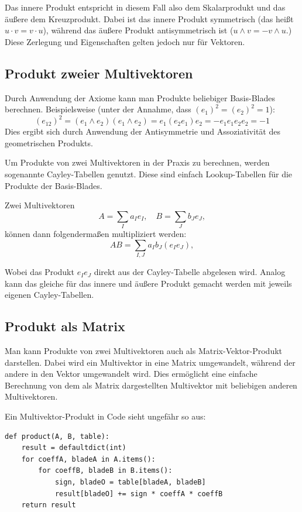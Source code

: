 \documentclass[
	ngerman,%
	accentcolor=9c,%
	ruledheaders=section,%
	class=report,%
	thesis={type=bachelor},%
	fontsize=11pt,%
	parskip=half-,%
	custommargins=true,%
	marginpar=false,%
]{tudapub}
\begin{document}
Das innere Produkt entspricht in diesem Fall also dem Skalarprodukt und das äußere dem Kreuzprodukt.
Dabei ist das innere Produkt symmetrisch (das heißt
\(u \cdot v = v \cdot u\)),
während das äußere Produkt antisymmetrisch ist
(\(u \wedge v = - v \wedge u.\))
Diese Zerlegung und Eigenschaften gelten jedoch nur für Vektoren.

\subsection{Produkt zweier Multivektoren}
Durch Anwendung der Axiome kann man Produkte beliebiger Basis-Blades berechnen. Beispielsweise (unter der Annahme, dass \((e_{1})^2=(e_{2})^2=1\)): 
\[
(e_{12})^2 = (e_1 \wedge e_2)(e_1 \wedge e_2) = e_1 (e_2 e_1) e_2 = - e_1 e_1 e_2 e_2 = -1
\]
Dies ergibt sich durch Anwendung der Antisymmetrie und Assoziativität des geometrischen Produkts.

Um Produkte von zwei Multivektoren in der Praxis zu berechnen, werden sogenannte Cayley-Tabellen genutzt.
Diese sind einfach Lookup-Tabellen für die Produkte der Basis-Blades.



Zwei Multivektoren 
\[
A = \sum_I a_I e_I, \quad B = \sum_J b_J e_J,
\]
können dann folgendermaßen multipliziert werden:
\[
AB = \sum_{I,J} a_I b_J (e_I e_J),
\]

Wobei das Produkt \(e_I e_J\) direkt aus der Cayley-Tabelle abgelesen wird.
Analog kann das gleiche für das innere und äußere Produkt gemacht werden mit jeweils eigenen Cayley-Tabellen.



\subsection{Produkt als Matrix}

Man kann Produkte von zwei Multivektoren auch als Matrix-Vektor-Produkt darstellen. 
Dabei wird ein Multivektor in eine Matrix umgewandelt, während der andere in den Vektor umgewandelt wird. Dies ermöglicht eine einfache Berechnung von dem als Matrix dargestellten Multivektor mit beliebigen anderen Multivektoren.


Ein Multivektor-Produkt in Code sieht ungefähr so aus:

\begin{verbatim}
def product(A, B, table):
    result = defaultdict(int)
    for coeffA, bladeA in A.items():
        for coeffB, bladeB in B.items():
            sign, bladeO = table[bladeA, bladeB]
            result[bladeO] += sign * coeffA * coeffB
    return result
\end{verbatim}
\end{document}
